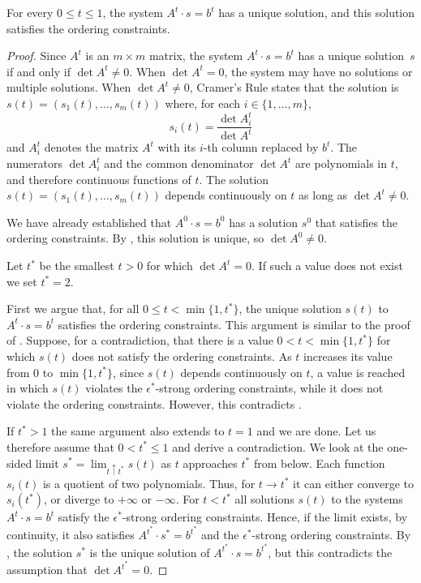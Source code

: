 \begin{lem}
	For every $0\le t\le 1$, the system $A^t\cdot s=b^t$ has a unique solution,
	and this solution satisfies the ordering constraints. %
\end{lem}

\begin{proof}
	Since $A^t$ is an $m\times m$ matrix, the system $A^t\cdot
	s=b^t$ has a unique solution~$s$ if and only if $\det A^t \neq 0$.
	When $\det A^t =0$, the system may have no solutions or
	multiple solutions.  
	When $\det A^t\neq 0$, 
	Cramer's Rule states that
	the solution
	is $s(t)=(s_1(t),\ldots,s_m(t))$ where, for each
	$i\in\{1,\ldots,m\}$,
	\[ 
	s_i(t) = \frac{\det A^t_i}{\det A^t }
	\]
	and $A^t_i$ denotes the matrix $A^t$ with its $i$-th column replaced
	by $b^t$. 
	The numerators $\det A^t_i$ and the common
	denominator $\det A^t $ are polynomials in $t$, and therefore
	continuous
	functions of $t$.
	The solution $s(t)=(s_1(t),\ldots,s_m(t))$ depends continuously on $t$
	as long as  $\det A^t\ne0 $.
	
	We have already established that $A^0\cdot s=b^0$ has a
	solution $s^0$ that satisfies the ordering constraints. By
	, this solution is unique, so $\det A^0\neq 0$.
	
	Let $t^*$ be the smallest $t>0$
	for which 
	$\det A^{t}= 0$. If such a value does not exist we set $t^*=2$.
	
	First we argue that, for all $0\le t <\min \{1,t^*\}$, the unique solution $s(t)$ to $A^t\cdot s=b^t$ satisfies the ordering constraints. This argument is similar to the proof of . Suppose, for a contradiction, that there is a value $0<t<\min\{1,t^*\}$ for which $s(t)$ does not satisfy the ordering constraints. As $t$ increases its value from $0$ to $\min\{1,t^*\}$, since $s(t)$ depends continuously on $t$, a value is reached in which $s(t)$ violates the $\epsilon^*$-strong ordering constraints, while it does not violate the ordering constraints. However, this contradicts	.
	
	If $t^*>1$ the same argument also extends to $t=1$ and we are done.
	Let us therefore assume that $0<t^*\le 1$ and derive a contradiction.
	We look at the one-sided limit $s^*=\lim_{t\uparrow t^*}
	s(t)$
as $t$ approaches $t^*$ from below.
	Each function $s_i(t)$ is a quotient of two polynomials.
	Thus, for $t\to t^*$ it can either converge to $s_i(t^*)$, or diverge to $+\infty$ or $-\infty$.
	For $t<t^*$ all solutions $s(t)$ to the systems $A^t\cdot s=b^t$ satisfy the $\epsilon^*$-strong ordering constraints.
	Hence, if the limit exists, by continuity, it also satisfies $A^{t^*}\cdot s^*=b^{t^*}$
	and the $\epsilon^*$-strong ordering constraints.
	By , the solution $s^*$ is
	the unique solution
	of $A^{t^*}\cdot s=b^{t^*}$, but this contradicts the assumption
	that $\det A^{t^*}= 0$.
	

\end{proof}
